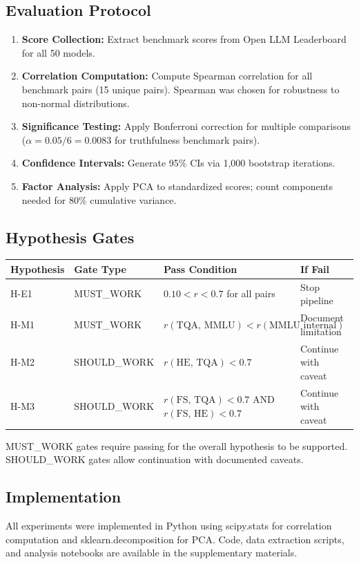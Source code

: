 \subsection{Evaluation Protocol}

\begin{enumerate}
\item \textbf{Score Collection:} Extract benchmark scores from Open LLM Leaderboard for all 50 models.

\item \textbf{Correlation Computation:} Compute Spearman correlation for all benchmark pairs (15 unique pairs). Spearman was chosen for robustness to non-normal distributions.

\item \textbf{Significance Testing:} Apply Bonferroni correction for multiple comparisons ($\alpha = 0.05/6 = 0.0083$ for truthfulness benchmark pairs).

\item \textbf{Confidence Intervals:} Generate 95\% CIs via 1,000 bootstrap iterations.

\item \textbf{Factor Analysis:} Apply PCA to standardized scores; count components needed for 80\% cumulative variance.
\end{enumerate}

\subsection{Hypothesis Gates}

\begin{table}[h]
\centering
\begin{tabular}{@{}llll@{}}
\toprule
\textbf{Hypothesis} & \textbf{Gate Type} & \textbf{Pass Condition} & \textbf{If Fail} \\
\midrule
H-E1 & MUST\_WORK & $0.10 < r < 0.7$ for all pairs & Stop pipeline \\
H-M1 & MUST\_WORK & $r(\text{TQA, MMLU}) < r(\text{MMLU internal})$ & Document limitation \\
H-M2 & SHOULD\_WORK & $r(\text{HE, TQA}) < 0.7$ & Continue with caveat \\
H-M3 & SHOULD\_WORK & $r(\text{FS, TQA}) < 0.7$ AND $r(\text{FS, HE}) < 0.7$ & Continue with caveat \\
\bottomrule
\end{tabular}
\end{table}

MUST\_WORK gates require passing for the overall hypothesis to be supported. SHOULD\_WORK gates allow continuation with documented caveats.

\subsection{Implementation}

All experiments were implemented in Python using scipy.stats for correlation computation and sklearn.decomposition for PCA. Code, data extraction scripts, and analysis notebooks are available in the supplementary materials.
